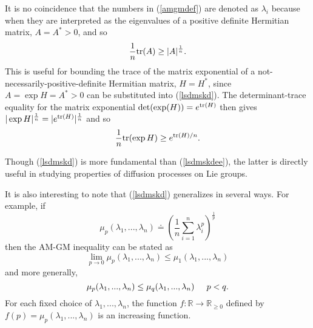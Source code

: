 \documentclass{svmult}
\newcommand{\beq}{ \begin{equation}}
\newcommand{\eeq}{ \end{equation} }
\newcommand{\IR}{\mathbb{R}}
\begin{document}
It is no coincidence that the numbers in (\ref{amgmdef}) are denoted as $\lambda_i$ because when they are interpreted as the eigenvalues of a positive definite Hermitian matrix, $A = A^* >0$, and so
\beq
\frac{1}{n} {\rm tr}(A) \geq |A|^{\frac{1}{n}}.
\label{lsdmskd}
\eeq
This is useful for bounding the trace of the matrix exponential of a not-necessarily-positive-definite Hermitian matrix, $H = H^*$, since
$A = \exp H = A^* > 0$ can be substituted into (\ref{lsdmskd}). The determinant-trace equality for the matrix exponential
${\rm det}(\exp(H)) = e^{{\rm tr}(H)}$ then gives $|\exp H|^{\frac{1}{n}} = |e^{{\rm tr}(H)}|^{\frac{1}{n}} $
and so
\beq
\frac{1}{n} {\rm tr}(\exp H) \geq  e^{{\rm tr}(H)/n}.
\label{lsdmskdee}
\eeq

Though (\ref{lsdmskd}) is more fundamental than (\ref{lsdmskdee}), the latter is directly useful in studying properties of
diffusion processes on Lie groups.

It is also interesting to note that (\ref{lsdmskd}) generalizes in several ways. For example, if
$$ \mu_p(\lambda_1,...,\lambda_n) \doteq \left(\frac{1}{n} \sum_{i=1}^{n} \lambda_i^p \right)^{\frac{1}{p}} $$
then the AM-GM inequality can be stated as
$$ \lim_{p\rightarrow 0} \mu_p(\lambda_1,...,\lambda_n)  \leq \mu_1(\lambda_1,...,\lambda_n) $$
and more generally,
\beq
\mu_p(\lambda_1,...,\lambda_n)  \leq \mu_q(\lambda_1,...,\lambda_n) \hskip 0.2 true in p < q.
\label{genmean}
\eeq
For each fixed choice of $\lambda_1,...,\lambda_n$, the function $f:\IR \rightarrow \IR_{\geq 0}$
defined by $f(p) = \mu_p(\lambda_1,...,\lambda_n)$ is an increasing function.
\end{document}
